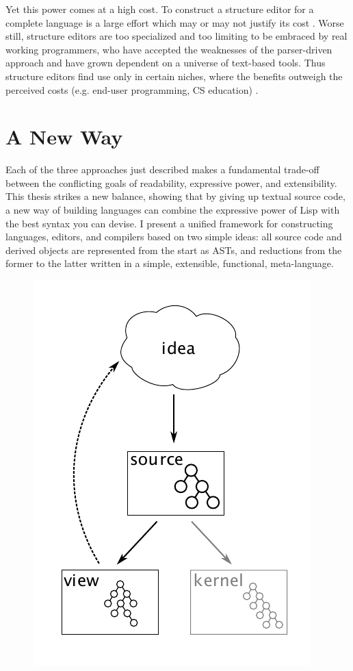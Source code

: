 Yet this power comes at a high cost. To construct a structure editor for a complete language is a large effort which may or may not justify its cost \cite{lang}. Worse still, structure editors are too specialized and too limiting to be embraced by real working programmers, who have accepted the weaknesses of the parser-driven approach and have grown dependent on a universe of text-based tools. Thus structure editors find use only in certain niches, where the benefits outweigh the perceived costs (e.g. end-user programming, CS education) \cite{alice}.

%
%
\section{A New Way}

Each of the three approaches just described makes a fundamental trade-off between the conflicting goals of readability, expressive power, and extensibility. This thesis strikes a new balance, showing that by giving up textual source code, a new way of building languages can combine the expressive power of Lisp with the best syntax you can devise. I present a unified framework for constructing languages, editors, and compilers based on two simple ideas: all source code and derived objects are represented from the start as ASTs, and reductions from the former to the latter written in a simple, extensible, functional, meta-language.

\begin{figure}[th]
  \centering

  \includegraphics[scale=0.75]{src/image/figure2.pdf}

  \caption{\Meta}
  \label{fig-2}
\end{figure}

